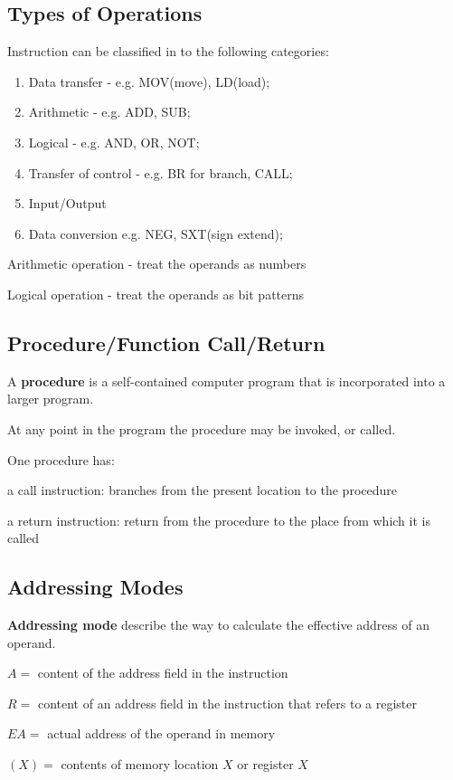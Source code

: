 \documentclass[11pt,a4paper]{article}
\begin{document}
\subsection{Types of Operations}
Instruction can be classified in to the following categories: \par
\begin{enumerate}
    \item [1. ] Data transfer - e.g. MOV(move), LD(load);
    \item [2. ] Arithmetic - e.g. ADD, SUB;
    \item [3. ] Logical - e.g. AND, OR, NOT;
    \item [4. ] Transfer of control - e.g. BR for branch, CALL;
    \item [5. ] Input/Output
    \item [6. ] Data conversion e.g. NEG, SXT(sign extend);
\end{enumerate}

Arithmetic operation - treat the operands as numbers \par
Logical operation - treat the operands as bit patterns \par

\subsection{Procedure/Function Call/Return}
A \textbf{procedure} is a self-contained computer program that is incorporated into a larger program. \par
At any point in the program the procedure may be invoked, or called. \par
One procedure has: \par
a call instruction: branches from the present location to the procedure \par
a return instruction: return from the procedure to the place from which it is called


\subsection{Addressing Modes}
\textbf{Addressing mode} describe the way to calculate the effective address of an operand. \par
$A = $ content of the address field in the instruction \par
$R = $ content of an address field in the instruction that refers to a register \par
$EA = $ actual address of the operand in memory \par
$(X) = $ contents of memory location $X$ or register $X$ \par
\end{document}
